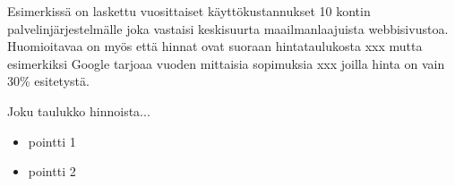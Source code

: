 \documentclass[finnish]{tktltiki2}
\theoremstyle{definition}
\theoremstyle{remark}
\begin{document}
Esimerkissä on laskettu vuosittaiset käyttökustannukset 10 kontin palvelinjärjestelmälle joka vastaisi keskisuurta maailmanlaajuista webbisivustoa. Huomioitavaa on myös että hinnat ovat suoraan hintataulukosta xxx mutta esimerkiksi Google tarjoaa vuoden mittaisia sopimuksia xxx joilla hinta on vain 30\% esitetystä.

Joku taulukko hinnoista...

\begin{itemize}
    \item pointti 1
    \item pointti 2
\end{itemize}

\newpage


\end{document}
